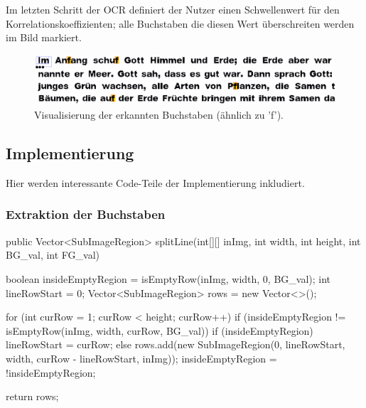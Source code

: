 \documentclass[german,notitlepage,smartquotes]{hgbreport}
\begin{document}
Im letzten Schritt der OCR definiert der Nutzer einen Schwellenwert für den Korrelationskoeffizienten; alle Buchstaben die diesen Wert überschreiten werden im Bild markiert.

\begin{figure}[h]
\centering
\includegraphics[width=.85\textwidth]{recognized_chars}
\caption{Visualisierung der erkannten Buchstaben (ähnlich zu 'f').}
\label{fig:recognized_chars}
\end{figure}

\subsection{Implementierung}

Hier werden interessante Code-Teile der Implementierung inkludiert.

\subsubsection{Extraktion der Buchstaben}

\begin{program}[h]
\caption{\texttt{splitLine(...)}}
\label{prog:extract-01}
\begin{JavaCode}
public Vector<SubImageRegion> splitLine(int[][] inImg, int width, int height, int BG_val, int FG_val) {
	boolean insideEmptyRegion = isEmptyRow(inImg, width, 0, BG_val);
	int lineRowStart = 0;
	Vector<SubImageRegion> rows = new Vector<>();

	for (int curRow = 1; curRow < height; curRow++) {
		if (insideEmptyRegion != isEmptyRow(inImg, width, curRow, BG_val)) {
			if (insideEmptyRegion) {
				lineRowStart = curRow;
			} else {
				rows.add(new SubImageRegion(0, lineRowStart, width, curRow - lineRowStart, inImg));
			}
			insideEmptyRegion = !insideEmptyRegion;
		}
	}

	return rows;
}
\end{JavaCode}
\end{program}
\end{document}
